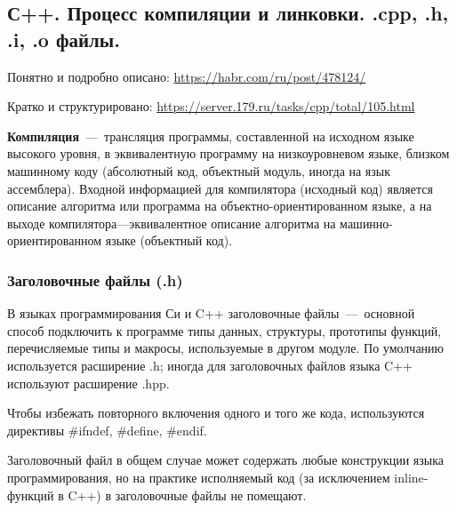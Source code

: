 \subsection{С++. Процесс компиляции и линковки. .cpp, .h, .i, .o файлы.}
Понятно и подробно описано: 
\href{https://habr.com/ru/post/478124/}{https://habr.com/ru/post/478124/}

Кратко и структурировано: \href{https://server.179.ru/tasks/cpp/total/105.html}{https://server.179.ru/tasks/cpp/total/105.html}

\textbf{Компиляция}~---~трансляция программы, составленной на исходном языке высокого уровня, в эквивалентную программу на низкоуровневом языке, близком машинному коду (абсолютный код, объектный модуль, иногда на язык ассемблера). Входной информацией для компилятора (исходный код) является описание алгоритма или программа на объектно-ориентированном языке, а на выходе компилятора—эквивалентное описание алгоритма на машинно-ориентированном языке (объектный код).

\subsubsection{Заголовочные файлы (.h)}

В языках программирования Си и C++ заголовочные файлы~---~основной способ подключить к программе типы данных, структуры, прототипы функций, перечисляемые типы и макросы, используемые в другом модуле. По умолчанию используется расширение .h; иногда для заголовочных файлов языка C++ используют расширение .hpp.

Чтобы избежать повторного включения одного и того же кода, используются директивы \#ifndef, \#define, \#endif.

Заголовочный файл в общем случае может содержать любые конструкции языка программирования, но на практике исполняемый код (за исключением inline-функций в C++) в заголовочные файлы не помещают.